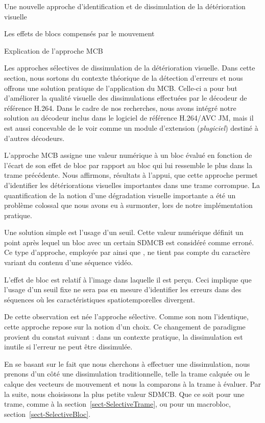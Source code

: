 \documentclass[letterpaper, twoside, 12pt,memoire]{thETS}
\newcommand{\SC}[1]{%
	{
	\todo[inline,color={red!100!green!33!}]{%
	\textbf{[SC]:}~#1}
	}}
\newcommand{\ltCodec}{logiciel de référence H.264/AVC JM}
\begin{document}
\begin{chapter}{Une nouvelle approche d'identification et de dissimulation de la
détérioration visuelle}
\begin{section}{Les effets de blocs compensés par le mouvement}
\begin{subsection}{Explication de l'approche MCB}
\end{subsection}

\end{section}

\begin{section}{Les approches sélectives de dissimulation de la détérioration
visuelle.}
\label{sect-Selectives}
Dans cette section, nous sortons du contexte théorique de la détection d'erreurs
et nous offrons une solution pratique de l'application du MCB. Celle-ci a pour
but d'améliorer la qualité visuelle des dissimulations effectuées par le
décodeur de référence H.264. Dans le cadre de nos recherches, nous avons intégré
notre solution au décodeur inclus dans le \ltCodec, mais il est aussi concevable
de le voir comme un module d'extension (\textit{plugiciel}) destiné à d'autres
décodeurs.

L'approche MCB assigne une valeur numérique à un bloc évalué en fonction de
l'écart de son effet de bloc par rapport au bloc qui lui ressemble le plus dans
la trame précédente. Nous affirmons, résultats à l'appui, que cette approche permet d'identifier les
détériorations visuelles importantes dans une trame corrompue. La quantification de
la notion d'une dégradation visuelle importante a été un problème colossal que
nous avons eu à surmonter, lors de notre implémentation pratique.

Une solution simple est l'usage d'un seuil. Cette valeur numérique définit un
point après lequel un bloc avec un certain SDMCB est considéré comme erroné. Ce
type d'approche, employée par \citet{Superiori2007} ainsi que \citet{Ikuno2007},
ne tient pas compte du caractère variant du contenu d'une séquence vidéo.

L'effet de bloc est relatif à l'image dans laquelle il est perçu. Ceci implique
que l'usage d'un seuil fixe ne sera pas en mesure d'identifier les erreurs dans
des séquences où les caractéristiques spatiotemporelles divergent.

De cette observation est née l'approche sélective. Comme son nom l'identique,
cette approche repose sur la notion d'un choix. Ce changement de paradigme
provient du constat suivant : dans un contexte pratique, la dissimulation
est inutile si l'erreur ne peut être dissimulée.
\SC{Phrase bizarre. la détection est inutile?}

En se basant sur le fait que nous cherchons à effectuer une dissimulation, nous
prenons d'un côté une dissimulation traditionnelle, telle la trame calquée ou le
calque des vecteurs de mouvement et nous la comparons à la trame à évaluer. Par
la suite, nous choisissons la plus petite valeur SDMCB. Que ce soit pour une
trame, comme à la section~\ref{sect-SelectiveTrame}, ou pour un macrobloc,
section~\ref{sect-SelectiveBloc}.


\end{section}
\end{chapter}
\end{document}
